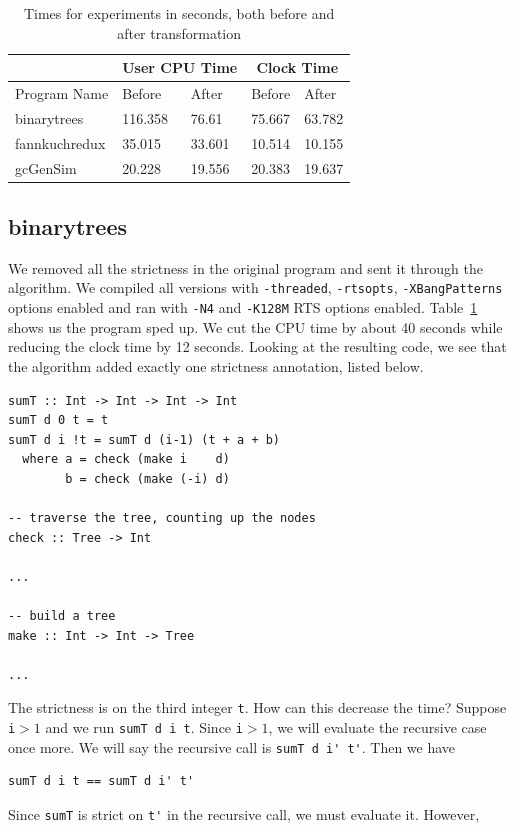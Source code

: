 \documentclass[preprint,nocopyrightspace]{sigplanconf}
\begin{document}
\begin{table}[t]
\label{tab:expr}
\begin{tabular}{| l | l | l | l | l |}
\hline
 & \multicolumn{2}{|c|}{User CPU Time} & \multicolumn{2}{|c|}{Clock Time}\\
\hline
Program Name & Before & After & Before & After\\
\hline
binarytrees & 116.358 & 76.61 & 75.667 & 63.782\\
\hline
fannkuchredux & 35.015 & 33.601 & 10.514 & 10.155\\
\hline
gcGenSim & 20.228 & 19.556 & 20.383 & 19.637\\
\hline
\end{tabular}
\caption{Times for experiments in seconds, both before and after transformation}
\end{table}
\subsection{binarytrees}
We removed all the strictness in the original program and sent it through the algorithm. We compiled all versions with \lstinline!-threaded!, \lstinline!-rtsopts!, \lstinline!-XBangPatterns! options enabled and ran with \lstinline!-N4! and \lstinline!-K128M! RTS options enabled. Table~\ref{tab:expr} shows us the program sped up. We cut the CPU time by about 40 seconds while reducing the clock time by 12 seconds. Looking at the resulting code, we see that the algorithm added exactly one strictness annotation, listed below.
\begin{lstlisting}
sumT :: Int -> Int -> Int -> Int
sumT d 0 t = t
sumT d i !t = sumT d (i-1) (t + a + b)
  where a = check (make i    d)
        b = check (make (-i) d)

-- traverse the tree, counting up the nodes
check :: Tree -> Int

...

-- build a tree
make :: Int -> Int -> Tree

...
\end{lstlisting}
The strictness is on the third integer \lstinline!t!. How can this decrease the time? Suppose \lstinline!i!$ > 1$ and we run \lstinline!sumT d i t!. Since \lstinline!i!$ > 1$, we will evaluate the recursive case once more. We will say the recursive call is \lstinline!sumT d i' t'!. Then we have 
\begin{lstlisting}
sumT d i t == sumT d i' t'
\end{lstlisting}
Since \lstinline!sumT! is strict on \lstinline!t'! in the recursive call, we must evaluate it. However,
\end{document}
